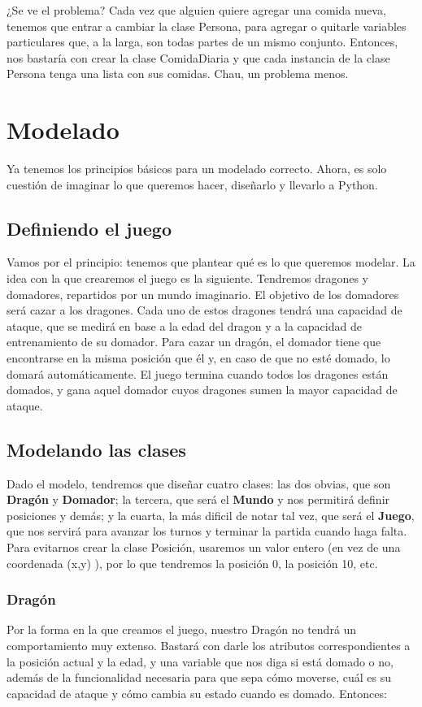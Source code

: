 \documentclass{article}
\begin{document}
¿Se ve el problema? Cada vez que alguien quiere agregar una comida nueva, tenemos que entrar a cambiar la clase Persona, para agregar o quitarle variables particulares que, a la larga, son todas partes de un mismo conjunto. Entonces, nos bastaría con crear la clase ComidaDiaria y que cada instancia de la clase Persona tenga una lista con sus comidas. Chau, un problema menos.

\section{Modelado}

Ya tenemos los principios básicos para un modelado correcto. Ahora, es solo cuestión de imaginar lo que queremos hacer, diseñarlo y llevarlo a Python.

\subsection{Definiendo el juego}
Vamos por el principio: tenemos que plantear qué es lo que queremos modelar. La idea con la que crearemos el juego es la siguiente. Tendremos dragones y domadores, repartidos por un mundo imaginario. El objetivo de los domadores será cazar a los dragones. Cada uno de estos dragones tendrá una capacidad de ataque, que se medirá en base a la edad del dragon y a la capacidad de entrenamiento de su domador. Para cazar un dragón, el domador tiene que encontrarse en la misma posición que él y, en caso de que no esté domado, lo domará automáticamente. El juego termina cuando todos los dragones están domados, y gana aquel domador cuyos dragones sumen la mayor capacidad de ataque.

\subsection{Modelando las clases}
Dado el modelo, tendremos que diseñar cuatro clases: las dos obvias, que son \textbf{Dragón} y \textbf{Domador}; la tercera, que será el \textbf{Mundo} y nos permitirá definir posiciones y demás; y la cuarta, la más dificil de notar tal vez, que será el \textbf{Juego}, que nos servirá para avanzar los turnos y terminar la partida cuando haga falta. Para evitarnos crear la clase Posición, usaremos un valor entero (en vez de una coordenada (x,y) ), por lo que tendremos la posición 0, la posición 10, etc.

\subsubsection{Dragón}
Por la forma en la que creamos el juego, nuestro Dragón no tendrá un comportamiento muy extenso. Bastará con darle los atributos correspondientes a la posición actual y la edad, y una variable que nos diga si está domado o no, además de la funcionalidad necesaria para que sepa cómo moverse, cuál es su capacidad de ataque y cómo cambia su estado cuando es domado. Entonces: \newline
\end{document}
